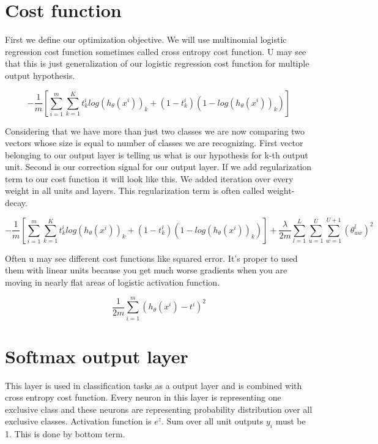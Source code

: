 \section{Cost function}
First we define our optimization objective. We will use multinomial logistic regression cost function sometimes called cross entropy cost function. U may see that this is just generalization of our logistic regression cost function for multiple output hypothesis.

\begin{equation}
-\frac{1}{m}[\sum\limits_{i=1}^m \sum\limits_{k=1}^K t^i_k log(h_\theta(x^i))_k + (1-t^i_k) (1 - log(h_\theta(x^i))_k)]
\end{equation}

Considering that we have more than just two classes we are now comparing two vectors whose size is equal to number of classes we are recognizing. First vector  belonging to our output layer is telling us what is our hypothesis for k-th output unit. Second is our correction signal for our output layer. If we add regularization term to our cost function it will look like this. We added iteration over every weight in all units and layers. This regularization term is often called weight-decay.

\begin{equation}
-\frac{1}{m}[\sum\limits_{i=1}^m \sum\limits_{k=1}^K t^i_k log(h_\theta(x^i))_k + (1-t^i_k) (1 - log(h_\theta(x^i))_k)] + \frac{\lambda}{2m}\sum\limits_{l=1}^L \sum\limits_{u=1}^U \sum\limits_{w=1}^{U+1}(\theta^l_{uw})^2 
\end{equation}

Often u may see different cost functions like squared error. It's proper to used them with linear units because you get much worse gradients when you are moving in nearly flat areas of logistic activation function.

\begin{equation}
\frac{1}{2m}\sum\limits_{i=1}^m(h_\theta(x^i) - t^i)^2
\end{equation}

\section{Softmax output layer}
This layer is used in classification tasks as a output layer and is combined with cross entropy cost function. Every neuron in this layer is representing one exclusive class and these neurons are representing probability distribution over all exclusive classes. Activation function is \(e^z\). Sum over all unit outputs \(y_i\) must be 1. This is done by bottom term.


